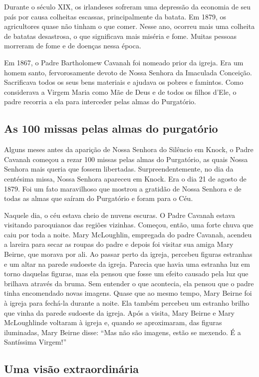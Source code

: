 \documentclass[a4paper,14pt]{extarticle} \usepackage[utf8]{inputenc}
\begin{document}
Durante o século XIX, os irlandeses sofreram uma depressão da economia de seu país por causa colheitas escassas, principalmente da batata. Em 1879, os agricultores quase não tinham o que comer. Nesse ano, ocorreu mais uma colheita de batatas desastrosa, o que significava mais miséria e fome. Muitas pessoas morreram de fome e de doenças nessa época.

Em 1867, o Padre Bartholomew Cavanah foi nomeado prior da igreja. Era um homem santo, fervorosamente devoto de Nossa Senhora da Imaculada Conceição. Sacrificava todos os seus bens materiais e ajudava os pobres e famintos. Como considerava a Virgem Maria como Mãe de Deus e de todos os filhos d’Ele, o padre recorria a ela para interceder pelas almas do Purgatório.

\subsection{As 100 missas pelas almas do purgatório}

Alguns meses antes da aparição de Nossa Senhora do Silêncio em Knock, o Padre Cavanah começou a rezar 100 missas pelas almas do Purgatório, as quais Nossa Senhora mais queria que fossem libertadas. Surpreendentemente, no dia da centésima missa, Nossa Senhora apareceu em Knock. Era o dia 21 de agosto de 1879. Foi um fato maravilhoso que mostrou a gratidão de Nossa Senhora e de todas as almas que saíram do Purgatório e foram para o Céu.

Naquele dia, o céu estava cheio de nuvens escuras. O Padre Cavanah estava visitando paroquianos das regiões vizinhas. Começou, então, uma forte chuva que caiu por toda a noite. Mary McLoughlin, empregada do padre Cavanah, acendeu a lareira para secar as roupas do padre e depois foi visitar sua amiga Mary Beirne, que morava por ali. Ao passar perto da igreja, percebeu figuras estranhas e um altar na parede sudoeste da igreja. Parecia que havia uma estranha luz em torno daquelas figuras, mas ela pensou que fosse um efeito causado pela luz que brilhava através da bruma. Sem entender o que acontecia, ela pensou que o padre tinha encomendado novas imagens. Quase que ao mesmo tempo, Mary Beirne foi à igreja para fechá-la durante a noite. Ela também percebeu um estranho brilho que vinha da parede sudoeste da igreja. Após a visita, Mary Beirne e Mary McLoughlinde voltaram à igreja e, quando se aproximaram, das figuras iluminadas, Mary Beirne disse: “Mas não são imagens, estão se mexendo. É a Santíssima Virgem!”

\subsection{Uma visão extraordinária}
\end{document}
